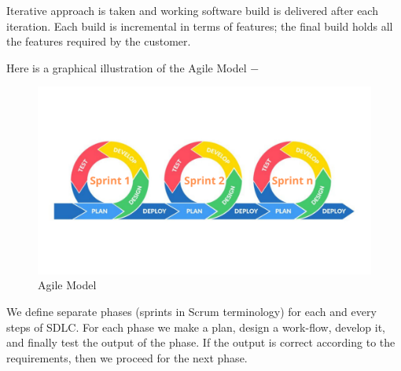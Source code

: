 Iterative approach is taken and working software build is delivered after each iteration. Each build is incremental in terms of features; the final build holds all the features required by the customer.


Here is a graphical illustration of the Agile Model −
\begin{figure}[H]
    \centering
    \includegraphics[width=1\textwidth]{images/agile}
    \caption{Agile Model}
    \label{fig:agile}
\end{figure}
We define separate phases (sprints in Scrum terminology) for each and every steps of SDLC. For each phase we make a plan, design a work-flow, develop it, and finally test the output of the phase. If the output is correct according to the requirements, then we proceed for the next phase.\\

